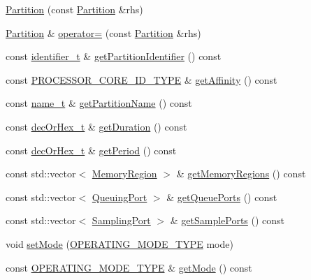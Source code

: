 \begin{DoxyCompactItemize}
\hyperlink{classPartition_a7b73af2fd7f67503730f5c71c62fe6c6}{Partition} (const \hyperlink{classPartition}{Partition} \&rhs)
\item 
\hyperlink{classPartition}{Partition} \& \hyperlink{classPartition_a713dda6b4b83804b2a89acd80e1943c8}{operator=} (const \hyperlink{classPartition}{Partition} \&rhs)
\item 
const \hyperlink{general__types_8hpp_a824b78b06da8112c2772bc666a63638d}{identifier\+\_\+t} \& \hyperlink{classPartition_a9cc857400ee0e4f9ee8aa4b9a781c404}{get\+Partition\+Identifier} () const 
\item 
const \hyperlink{apex__types_8h_ac081e44ca764e4d769f88a7f3bbc60de}{P\+R\+O\+C\+E\+S\+S\+O\+R\+\_\+\+C\+O\+R\+E\+\_\+\+I\+D\+\_\+\+T\+Y\+PE} \& \hyperlink{classPartition_a4c2128f809210418d6c51b984a9eceac}{get\+Affinity} () const 
\item 
const \hyperlink{structname__t}{name\+\_\+t} \& \hyperlink{classPartition_a354db1a01962503fd33d2fd7aa52a46d}{get\+Partition\+Name} () const 
\item 
const \hyperlink{general__types_8hpp_a0edc3a86ddf4aa205c6882b61cd7b4e9}{dec\+Or\+Hex\+\_\+t} \& \hyperlink{classPartition_a018beb609fcd147efb7fd20594f6446d}{get\+Duration} () const 
\item 
const \hyperlink{general__types_8hpp_a0edc3a86ddf4aa205c6882b61cd7b4e9}{dec\+Or\+Hex\+\_\+t} \& \hyperlink{classPartition_af904def70aa07d2ba5b13d7cdd376c2c}{get\+Period} () const 
\item 
const std\+::vector$<$ \hyperlink{classMemoryRegion}{Memory\+Region} $>$ \& \hyperlink{classPartition_aa408f64e917a3aa805a3beb2d0b2669f}{get\+Memory\+Regions} () const 
\item 
const std\+::vector$<$ \hyperlink{classQueuingPort}{Queuing\+Port} $>$ \& \hyperlink{classPartition_a052021916099d1ca1dfeb44da62216df}{get\+Queue\+Ports} () const 
\item 
const std\+::vector$<$ \hyperlink{classSamplingPort}{Sampling\+Port} $>$ \& \hyperlink{classPartition_a04d5680e6be455ed8fcd96ce18ae1f79}{get\+Sample\+Ports} () const 
\item 
void \hyperlink{classPartition_affe5d93a0bfe4e8af9a3cdfc8bc80091}{set\+Mode} (\hyperlink{apex__partition_8h_a79d9616db80ce78328edcd1987aa90b1}{O\+P\+E\+R\+A\+T\+I\+N\+G\+\_\+\+M\+O\+D\+E\+\_\+\+T\+Y\+PE} mode)
\item 
const \hyperlink{apex__partition_8h_a79d9616db80ce78328edcd1987aa90b1}{O\+P\+E\+R\+A\+T\+I\+N\+G\+\_\+\+M\+O\+D\+E\+\_\+\+T\+Y\+PE} \& \hyperlink{classPartition_a2861314450a4ff0256d7b3e0b5640860}{get\+Mode} () const 

\end{DoxyCompactItemize}
